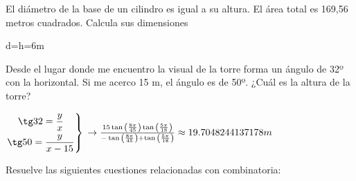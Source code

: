 \documentclass[addpoints,spanish, 12pt,a4paper]{exam}
\begin{document}
\begin{questions}
\begin{parts}
\part[1]$\dfrac{x - 1}{x^{2} + x}\geqslant 0$  
\begin{solution} $\left(-1, 0\right) \cup \left[1, \infty\right)$ \end{solution}


\end{parts}

\question[2] El  diámetro  de  la  base  de  un  cilindro  es  igual  a  su  altura.  El  área  total  es  169,56 metros cuadrados. Calcula sus dimensiones
\begin{solution}
d=h=6m
\end{solution}

\question[2]   Desde el lugar donde me encuentro la visual de la torre forma un ángulo de 32º con la
horizontal. Si me acerco 15 m, el ángulo es de 50º. ¿Cuál es la altura de la torre?
\begin{solution} $\left. \begin{gathered}
	  \tg 32 = \frac{y}{x} \\
	  \tg 50 = \frac{y}{x-15} \hfill
	 \end{gathered}  \right\rbrace \\
	 \to 
	 \frac{15 \tan{\left (\frac{8 \pi}{45} \right )} \tan{\left (\frac{5 \pi}{18} \right )}}{- \tan{\left (\frac{8 \pi}{45} \right )} + \tan{\left (\frac{5 \pi}{18} \right )}}\approx19.7048244137178 m $ \end{solution}

\question Resuelve las siguientes cuestiones relacionadas con combinatoria:
\end{questions}
\end{document}
